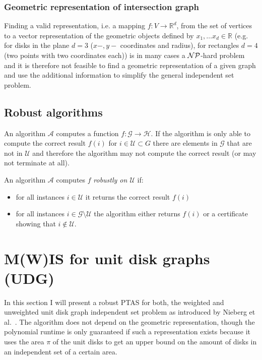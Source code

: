 \subsubsection{Geometric representation of  intersection graph}
Finding a valid representation, i.e. a mapping  $f : V \to \mathbb R^d$, from the set of vertices to a vector representation of the geometric objects defined by $x_1, \ldots x_d \in \mathbb R$ (e.g. for disks in the plane $d=3$ ($x-,y-$ coordinates and radius), for rectangles $d=4$ (two points with two coordinates each)) is in many cases a $\mathcal{NP}$-hard problem \cite{nphard} and it is therefore not feasible to find a geometric representation of a given graph and use the additional information to simplify the general independent set problem.

\subsection{Robust algorithms}
An algorithm $\mathcal A$ computes a function $f: \mathcal G \to \mathcal H$. If the algorithm is only able to compute the correct result $f(i)$ for $i \in \mathcal U \subset G$ there are elements in $\mathcal G$ that are not in $\mathcal U$ and therefore the algorithm may not compute the correct result (or may not terminate at all).
\begin{definition}
 An algorithm $\mathcal A$ computes $f$ \textit{robustly on $\mathcal U$} if:
\begin{itemize}
\item for all instances $i\in\mathcal U$ it returns the correct result $f(i)$
\item for all instances $i\in\mathcal G\setminus \mathcal U$ the algorithm either returns $f(i)$ or a certificate showing that $i\notin \mathcal U$.
\end{itemize}
\end{definition}

\section{M(W)IS for unit disk graphs (UDG)}
In this section I will present a robust PTAS for both, the weighted and unweighted unit disk graph independent set problem as introduced by Nieberg et al.~\cite{nieberg}. The algorithm does not depend on the geometric representation, though the polynomial runtime is only guaranteed if such a representation exists because it uses the area $\pi$ of the unit disks to get an upper bound on the amount of disks in an independent set of a certain area.
